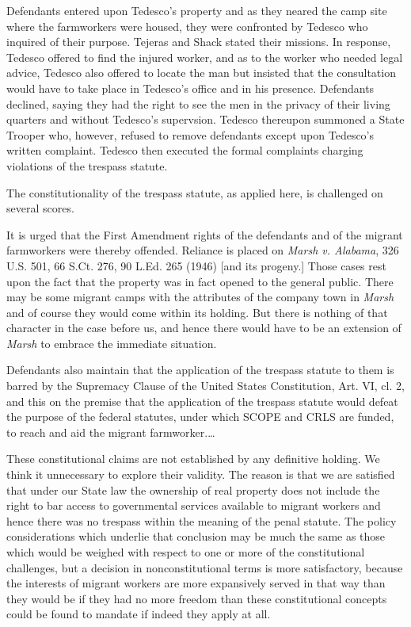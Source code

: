 Defendants entered upon Tedesco's property and as they neared the camp site
where the farmworkers were housed, they were confronted by Tedesco who inquired
of their purpose. Tejeras and Shack stated their missions. In response, Tedesco
offered to find the injured worker, and as to the worker who needed legal
advice, Tedesco also offered to locate the man but insisted that the
consultation would have to take place in Tedesco's office and in his presence.
Defendants declined, saying they had the right to see the men in the privacy of
their living quarters and without Tedesco's supervsion. Tedesco thereupon
summoned a State Trooper who, however, refused to remove defendants except upon
Tedesco's written complaint. Tedesco then executed the formal complaints
charging violations of the trespass statute.


The constitutionality of the trespass statute, as applied here, is challenged on
several scores.

It is urged that the First Amendment rights of the defendants and of the migrant
farmworkers were thereby offended. Reliance is placed on \emph{Marsh v.
Alabama}, 326
U.S. 501, 66 S.Ct. 276, 90 L.Ed. 265 (1946) [and its progeny.] Those cases rest
upon the fact that the property was in fact opened to the general public. There
may be some migrant camps with the attributes of the company town in
\emph{Marsh} and
of course they would come within its holding. But there is nothing of that
character in the case before us, and hence there would have to be an extension
of \emph{Marsh} to embrace the immediate situation.

Defendants also maintain that the application of the trespass statute to them is
barred by the Supremacy Clause of the United States Constitution, Art. VI, cl.
2, and this on the premise that the application of the trespass statute would
defeat the purpose of the federal statutes, under which SCOPE and CRLS are
funded, to reach and aid the migrant farmworker.\ldots

These constitutional claims are not established by any definitive holding. We
think it unnecessary to explore their validity. The reason is that we are
satisfied that under our State law the ownership of real property does not
include the right to bar access to governmental services available to migrant
workers and hence there was no trespass within the meaning of the penal
statute. The policy considerations which underlie that conclusion may be much
the same as those which would be weighed with respect to one or more of the
constitutional challenges, but a decision in nonconstitutional terms is more
satisfactory, because the interests of migrant workers are more expansively
served in that way than they would be if they had no more freedom than these
constitutional concepts could be found to mandate if indeed they apply at all.

